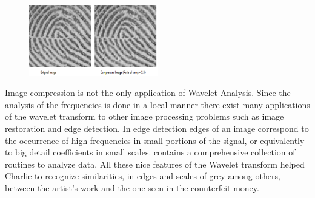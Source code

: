 	\begin{figure}[H]
	\centering
	\includegraphics[width=0.5\textwidth]{../sections/seasons/season1/107/images/fingerprint.png} 
	\end{figure}

Image compression is not the only application of Wavelet Analysis. Since the analysis of the frequencies is done in a local manner there exist many applications of the wavelet transform to other image processing problems such as image restoration and edge detection. In edge detection edges of an image correspond to the occurrence of high frequencies in small portions of the signal, or equivalently to big detail coefficients in small scales.  contains a comprehensive collection of routines to analyze data. All these nice features of the Wavelet transform helped Charlie to recognize similarities, in edges and scales of grey among others, between the artist's work and the one seen in the counterfeit money.


